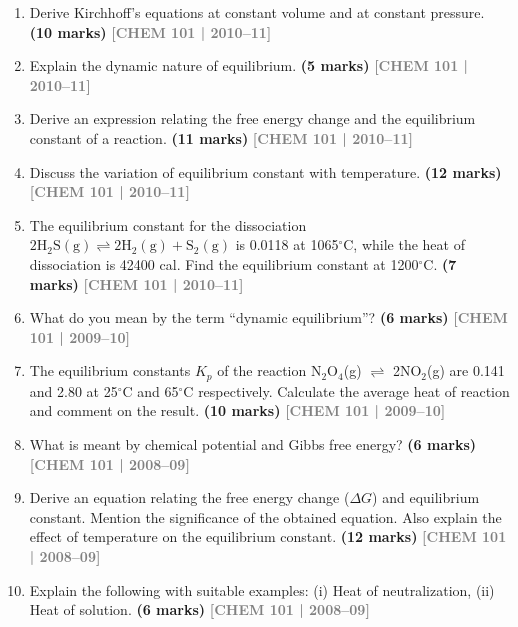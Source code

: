 \documentclass[12pt,a3paper]{article}
\newcommand{\yr}[1]{\hfill\textcolor{gray}{\small\textbf{[#1]}}}
\newcommand{\mk}[1]{\textcolor{orange!70!black}{\small\textbf{(#1 marks)}}}
\begin{document}
\begin{enumerate}
\item Derive Kirchhoff's equations at constant volume and at constant pressure. \mk{10}
\yr{CHEM 101 | 2010--11}



\item Explain the dynamic nature of equilibrium. \mk{5}
\yr{CHEM 101 | 2010--11}



\item Derive an expression relating the free energy change and the equilibrium constant of a reaction. \mk{11}
\yr{CHEM 101 | 2010--11}



\item Discuss the variation of equilibrium constant with temperature. \mk{12}
\yr{CHEM 101 | 2010--11}



\item The equilibrium constant for the dissociation $2\text{H}_2\text{S}(\text{g}) \rightleftharpoons 2\text{H}_2(\text{g}) + \text{S}_2(\text{g})$ is 0.0118 at 1065$^\circ$C, while the heat of dissociation is 42400 cal. Find the equilibrium constant at 1200$^\circ$C. \mk{7}
\yr{CHEM 101 | 2010--11}



\item What do you mean by the term ``dynamic equilibrium''? \mk{6}
\yr{CHEM 101 | 2009--10}


\item The equilibrium constants $K_p$ of the reaction N$_2$O$_4$(g) $\rightleftharpoons$ 2NO$_2$(g) are 0.141 and 2.80 at 25$^\circ$C and 65$^\circ$C respectively. Calculate the average heat of reaction and comment on the result. \mk{10}
\yr{CHEM 101 | 2009--10}



\item What is meant by chemical potential and Gibbs free energy? \mk{6}
\yr{CHEM 101 | 2008--09}



\item Derive an equation relating the free energy change ($\Delta G$) and equilibrium constant. Mention the significance of the obtained equation. Also explain the effect of temperature on the equilibrium constant. \mk{12}
\yr{CHEM 101 | 2008--09}



\item Explain the following with suitable examples: (i) Heat of neutralization, (ii) Heat of solution. \mk{6}
\yr{CHEM 101 | 2008--09}




\end{enumerate}
\end{document}
